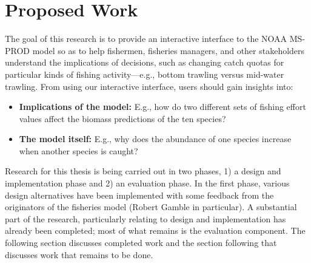 \chapter{Proposed Work}

The goal of this research is to provide an interactive interface to the NOAA MS-PROD model so as to help fishermen, fisheries managers, and other stakeholders understand the implications of decisions, such as changing catch quotas for particular kinds of fishing activity---e.g., bottom trawling versus mid-water trawling.  From using our interactive interface, users should gain insights into:
\begin{itemize}
	\item \textbf{Implications of the model:}  E.g., how do two different sets of fishing effort values affect the biomass predictions of the ten species?
	\item \textbf{The model itself:}  E.g., why does the abundance of one species increase when another species is caught? 
\end{itemize}

Research for this thesis is being carried out in two phases, 1) a design and implementation phase and 2) an evaluation phase.  In the first phase, various design alternatives have been implemented with some feedback from the originators of the fisheries model (Robert Gamble in particular).  A substantial part of the research, particularly relating to design and implementation has already been completed; most of what remains is the evaluation component.  The following section discusses completed work and the section following that discusses work that remains to be done.%





